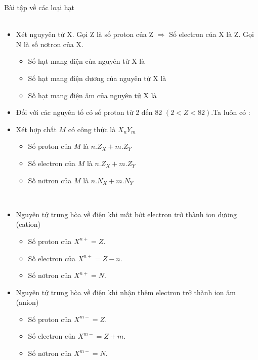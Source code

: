 \newpage
\begin{dangntd}{Bài tập về các loại hạt}
	\\
	\\
	\begin{itemize}
		\item	Xét nguyyên tử X. Gọi Z là số proton của Z
		$ \Rightarrow $ Số electron của X là Z.
		Gọi N  là số nơtron của X.
		\begin{itemize}
			\item Số hạt mang điện của nguyên tử X là 
			\item Số hạt mang điện dương của nguyên tử X là 
			\item Số hạt mang điện âm của nguyên tử X là 
		\end{itemize}
		\item Đối với các nguyên tố có số proton từ 2 đến 82 $ (2<Z<82) $.Ta luôn có : 
		\item Xét hợp chất $ M $ có công thức là $ X_{n}Y_{m} $
		\begin{itemize}
			\item Số proton của $ M $ là $ n.Z_{X} + m.Z_{Y} $
			\item Số electron của $ M $ là $ n.Z_{X} + m.Z_{Y} $
			\item Số nơtron của $ M $ là $ n.N_{X} + m.N_{Y} $
		\end{itemize}
	\end{itemize}
	\\
	\begin{itemize}
		\item Nguyên tử trung hòa về điện khi  mất bớt electron trở thành ion dương (cation)
		\begin{center}
		\end{center}
		\begin{itemize}
			\item Số proton của $ X^{n+} = Z $.
			\item Số electron của $ X^{n+} = Z-n $.
			\item Số nơtron của $ X^{n+} = N $.
		\end{itemize}
		
		\item Nguyên tử trung hòa về điện khi nhận thêm electron trở thành ion âm (anion)
		\begin{center}
		\end{center}
		\begin{itemize}
			\item Số proton của $ X^{m-} = Z $.
			\item Số electron của $ X^{m-} = Z+m $.
			\item Số nơtron của $ X^{m-} = N $.
		\end{itemize}
	\end{itemize}
\end{dangntd}
